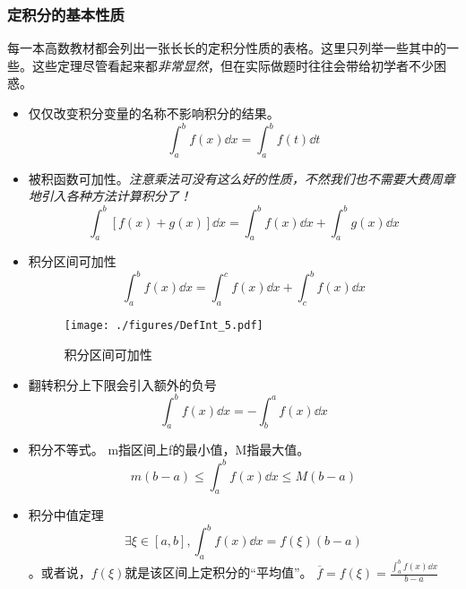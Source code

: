 \subsubsection{定积分的基本性质}
每一本高数教材\cite{同济高}\cite{Thomas}都会列出一张长长的定积分性质的表格。这里只列举一些其中的一些。这些定理尽管看起来都\textsl{非常显然}，但在实际做题时往往会带给初学者不少困惑。
\begin{itemize}
\item 仅仅改变积分变量的名称不影响积分的结果。
$$\int^b_a f(x) \dd x = \int^b_a f(t) \dd t$$
\item 被积函数可加性。\textsl{注意乘法可没有这么好的性质，不然我们也不需要大费周章地引入各种方法计算积分了！}
$$\int^b_a [f(x)+g(x)] \dd x = \int^b_a f(x)\dd x + \int^b_a g(x)\dd x$$
\item 积分区间可加性
$$\int^b_a f(x) \dd x = \int^c_a f(x) \dd x  + \int^b_c f(x) \dd x $$
\begin{figure}[ht]
\centering
\texttt{[image: ./figures/DefInt\_5.pdf]}
\caption{积分区间可加性} \label{DefInt_fig5}
\end{figure}
\item 翻转积分上下限会引入额外的负号%
$$\int^b_a f(x) \dd x = -\int^a_b f(x) \dd x$$
\item 积分不等式。 m指区间上f的最小值，M指最大值。
$$m(b-a)\le\int^b_a f(x) \dd x \le M(b-a)$$
\item 积分中值定理
$$\exists \xi \in [a,b], \int^b_a f(x) \dd x = f(\xi)(b-a)$$。或者说，$f(\xi)$就是该区间上定积分的“平均值”。 $ \overline f= f(\xi)=\frac{\int^b_a f(x) \dd x}{b-a}$
\end{itemize}

